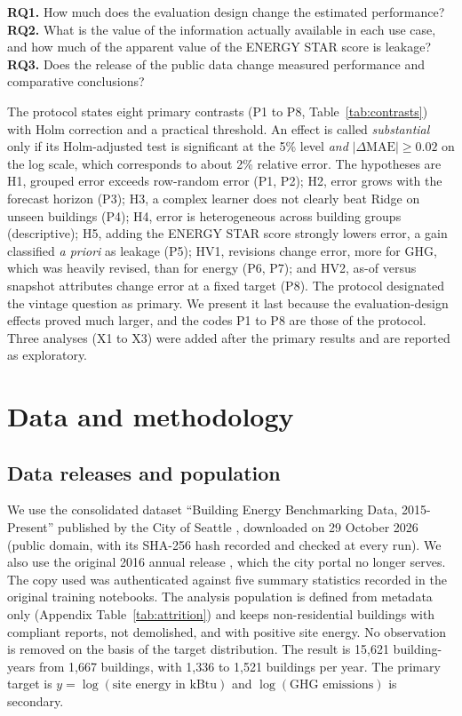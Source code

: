 \documentclass[11pt]{article}
\begin{document}
\textbf{RQ1.} How much does the evaluation design change the estimated performance? \textbf{RQ2.} What is the value of the information actually available in each use case, and how much of the apparent value of the ENERGY STAR score is leakage? \textbf{RQ3.} Does the release of the public data change measured performance and comparative conclusions?

The protocol states eight primary contrasts (P1 to P8, Table~\ref{tab:contrasts}) with Holm correction and a practical threshold. An effect is called \emph{substantial} only if its Holm-adjusted test is significant at the 5\% level \emph{and} $|\Delta\mathrm{MAE}|\ge0.02$ on the log scale, which corresponds to about 2\% relative error. The hypotheses are H1, grouped error exceeds row-random error (P1, P2); H2, error grows with the forecast horizon (P3); H3, a complex learner does not clearly beat Ridge on unseen buildings (P4); H4, error is heterogeneous across building groups (descriptive); H5, adding the ENERGY STAR score strongly lowers error, a gain classified \emph{a priori} as leakage (P5); HV1, revisions change error, more for GHG, which was heavily revised, than for energy (P6, P7); and HV2, as-of versus snapshot attributes change error at a fixed target (P8). The protocol designated the vintage question as primary. We present it last because the evaluation-design effects proved much larger, and the codes P1 to P8 are those of the protocol. Three analyses (X1 to X3) were added after the primary results and are reported as exploratory.

\section{Data and methodology}
\label{sec:methods}

\subsection{Data releases and population}
We use the consolidated dataset ``Building Energy Benchmarking Data, 2015-Present'' published by the City of Seattle \cite{seattle2026benchmarking}, downloaded on 29 October 2026 (public domain, with its SHA-256 hash recorded and checked at every run). We also use the original 2016 annual release \cite{seattle2016benchmarking_original}, which the city portal no longer serves. The copy used was authenticated against five summary statistics recorded in the original training notebooks. The analysis population is defined from metadata only (Appendix Table~\ref{tab:attrition}) and keeps non-residential buildings with compliant reports, not demolished, and with positive site energy. No observation is removed on the basis of the target distribution. The result is 15{,}621 building-years from 1{,}667 buildings, with 1{,}336 to 1{,}521 buildings per year. The primary target is $y=\log(\text{site energy in kBtu})$ and $\log(\text{GHG emissions})$ is secondary.
\end{document}
